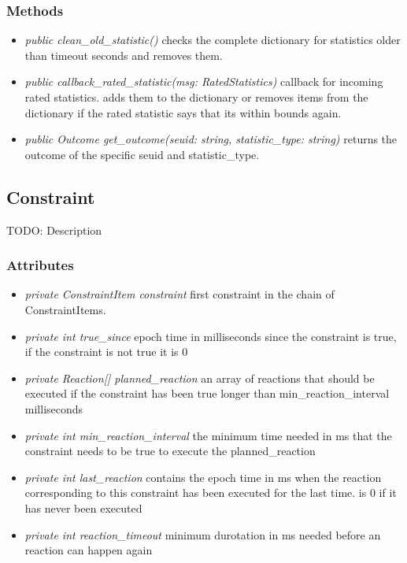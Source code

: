 \subsubsection{Methods}
\begin{itemize}
	\item \textit{ public clean\_old\_statistic() }
		checks the complete dictionary for statistics older than timeout seconds and removes them.
	\item \textit{ public callback\_rated\_statistic(msg: RatedStatistics) }
		callback for incoming rated statistics. adds them to the dictionary or removes items from the dictionary if the rated statistic says that its within bounds again. 
	\item \textit{ public Outcome get\_outcome(seuid: string, statistic\_type: string) }
		returns the outcome of the specific seuid and statistic\_type.
\end{itemize}

\subsection{Constraint }
TODO: Description


\subsubsection{Attributes}
\begin{itemize}
	\item \textit{ private  ConstraintItem constraint }
	first constraint in the chain of ConstraintItems.
	\item \textit{ private  int true\_since }
	epoch time in milliseconds since the constraint is true,
	if the constraint is not true it is 0
	\item \textit{ private  Reaction[] planned\_reaction }
	an array of reactions that should be executed if the constraint has been true longer than min\_reaction\_interval milliseconds
	\item \textit{ private  int min\_reaction\_interval }
	the minimum time needed in ms that the constraint needs to be true to execute the planned\_reaction
	\item \textit{ private  int last\_reaction }
	contains the epoch time in ms when the reaction corresponding to this constraint has been executed for the last time.
		is 0 if it has never been executed
	\item \textit{ private  int reaction\_timeout }
	minimum durotation in ms needed before an reaction can happen again
\end{itemize}
